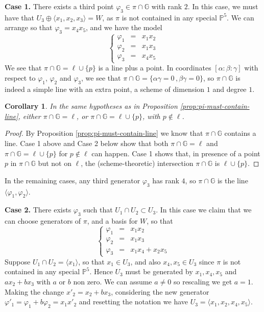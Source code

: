 \documentclass[10pt,reqno]{amsart}
\newcommand{\la}{\langle}
\newcommand{\ra}{\rangle}
\newcommand{\GG}{\mathbb{G}}
\newcommand{\PP}{\mathbb P}
\renewcommand{\a}{\alpha}
\renewcommand{\b}{\beta}
\newcommand{\g}{\gamma}
\newcommand{\f}{\varphi}
\newtheorem{corollary}[theorem]{Corollary}
\theoremstyle{definition}
\begin{document}
\noindent \textbf{Case 1.} There exists a third point $\f_3\in\pi\cap\GG$ with rank $2$. In this case, we must have that $U_3 \oplus \la x_1, x_2, x_3 \ra=W$, as $\pi$ is not contained in any special $\PP^5$. We can arrange so that $\f_3= x_4x_5$, and we have the model
\[ 
\left\{\begin{array}{ccl}
 \f_1 & = & x_1x_2\\
 \f_2 & = & x_1x_3\\
 \f_3 & = & x_4x_5
\end{array}\right.
\]
We see that $\pi \cap \GG=\ell \cup \{p\}$ is a line plus a point. In coordinates $[\a: \b: \g]$ with respect to $\f_1$, $\f_2$ and $\f_3$, we see that $\pi \cap \GG=\{\a \g=0 \, , \b \g =0 \}$,
so $\pi \cap \GG$ is indeed a simple line with an extra point, a scheme of dimension $1$ and degree $1$.

\begin{corollary} 
In the same hypotheses as in Proposition \ref{prop:pi-must-contain-line}, either $\pi\cap\GG=\ell$, or $\pi\cap\GG=\ell\cup\{p\}$, with $p\notin\ell$.
\end{corollary}
\begin{proof}
By Proposition \ref{prop:pi-must-contain-line} we know that $\pi\cap\GG$ contains a line. Case 1 above and Case 2 below show that both $\pi\cap\GG=\ell$ and $\pi\cap\GG=\ell\cup\{p\}$ for $p\notin\ell$ can happen. Case 1 shows that, in presence of a point $p$ in $\pi\cap\GG$ but not on $\ell$, the (scheme-theoretic) intersection $\pi\cap\GG$ is $\ell\cup\{p\}$.
\end{proof}

\noindent In the remaining cases, any third generator $\f_3$ has rank $4$, so $\pi \cap \GG$ is the line $\la\f_1,\f_2\ra$.

\noindent \textbf{Case 2.} There exists $\f_3$ such that $U_1 \cap U_2 \subset U_3$. In this case we claim that we can choose generators of $\pi$, and a basis for $W$, so that
\[ 
\left\{\begin{array}{ccl}
 \f_1 & = & x_1x_2\\
 \f_2 & = & x_1x_3\\
 \f_3 & = & x_1x_4+x_2x_5
\end{array}\right.
\]
Suppose $U_1\cap U_2=\la x_1\ra$, so that $x_1 \in U_3$, and also $x_4, x_5 \in U_3$ since $\pi$ is not contained in any special $\PP^5$. Hence $U_3$ must be generated by $x_1, x_4, x_5$ and $ax_2+bx_3$ with $a$ or $b$ non zero. We can assume $a \ne 0$ so rescaling we get $a=1$. Making the change $x'_2=x_2+bx_3$, considering the new generator $\f'_1=\f_1+b\f_2=x_1x'_2$ and resetting the notation we have $U_3=\la x_1, x_2,x_4,x_5\ra$. 
\end{document}
